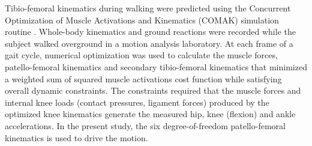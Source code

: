 Tibio-femoral kinematics during walking were predicted using the Concurrent Optimization of Muscle Activations and Kinematics (COMAK) simulation routine \cite{Smith2016,Smith2016influence2}. Whole-body kinematics and ground reactions were recorded while the subject walked overground in a motion analysis laboratory. At each frame of a gait cycle, numerical optimization was used to calculate the muscle forces, patello-femoral kinematics and secondary tibio-femoral kinematics that minimized a weighted sum of squared muscle activations cost function while satisfying overall dynamic constraints. The constraints required that the muscle forces and internal knee loads (contact pressures, ligament forces) produced by the optimized knee kinematics generate the measured hip, knee (flexion) and ankle accelerations. In the present study, the six degree-of-freedom patello-femoral kinematics is used to drive the motion.


